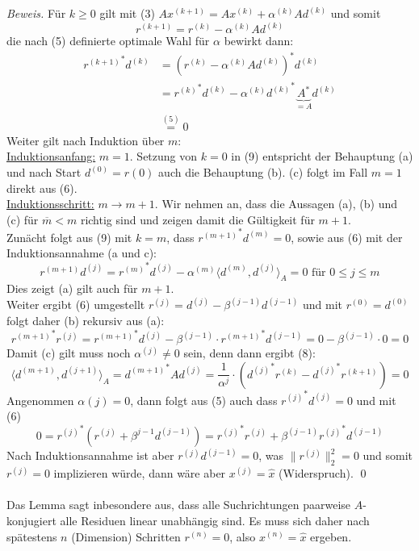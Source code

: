 \documentclass{article}
\begin{document}
\textit{Beweis.} Für $k\geq 0$ gilt mit (3) $Ax^{(k+1)} = Ax^{(k)} + \alpha^{(k)} Ad^{(k)}$ und somit 
\[r^{(k+1)}=r^{(k)}-\alpha^{(k)}Ad^{(k)}\tag{8}\]
die nach (5) definierte optimale Wahl für $\alpha$ bewirkt dann:
\begin{align*}
    {r^{(k+1)}}^*d^{(k)} &= (r^{(k)}-\alpha^{(k)}Ad^{(k)})^* d^{(k)} \\
    &= {r^{(k)}}^* d^{(k)} - \alpha^{(k)}{d^{(k)}}^*\underbrace{A^*}_{=A}d^{(k)} \\
    &\stackrel{(5)}{=} 0 \tag{9}
\end{align*}
Weiter gilt nach Induktion über $m$: \\
\underline{Induktionsanfang:} $m=1$. Setzung von $k=0$ in (9) entspricht der Behauptung (a) 
und nach Start $d^{(0)}=r{(0)}$ auch die Behauptung (b). (c) folgt im Fall $m=1$ direkt aus (6). \\
\underline{Induktionsschritt:} $m\rightarrow m+1$. Wir nehmen an, dass die Aussagen (a), (b) und (c) 
für $\overline{m}<m$ richtig sind und zeigen damit die Gültigkeit für $m+1$. \\
Zunächt folgt aus (9) mit $k=m$, dass ${r^{(m+1)}}^*d^{(m)} = 0$, sowie aus (6) mit der Induktionsannahme (a und c):
\[{r^{(m+1)}}d^{(j)} = {r^{(m)}}^*d^{(j)} - \alpha^{(m)}\langle d^{(m)}, d^{(j)} \rangle_A = 0 
\text{ für } 0\leq j\leq m\]
Dies zeigt (a) gilt auch für $m+1$. \\
Weiter ergibt (6) umgestellt $r^{(j)} = d^{(j)} - \beta^{(j-1)}d^{(j-1)}$ und mit $r^{(0)}=d^{(0)}$ folgt 
daher (b) rekursiv aus (a):
\[{r^{(m+1)}}^*r^{(j)} = {r^{(m+1)}}^*d^{(j)} - \beta^{(j-1)}\cdot {r^{(m+1)}}^*d^{(j-1)} = 
0 - \beta^{(j-1)}\cdot 0 = 0\]
Damit (c) gilt muss noch $\alpha^{(j)}\neq 0$ sein, denn dann ergibt (8):
\[\langle d^{(m+1)}, d^{(j+1)}\rangle_A = {d^{(m+1)}}^*Ad^{(j)} = 
\dfrac{1}{\alpha^{j}}\cdot\left({d^{(j)}}^*r^{(k)}-{d^{(j)}}^*r^{(k+1)}\right) = 0 \]
Angenommen $\alpha{(j)} = 0$, dann folgt aus (5) auch dass ${r^{(j)}}^*d^{(j)}=0$ und mit (6) 
\[0 = {r^{(j)}}^*\left(r^{(j)}+\beta^{j-1}d^{(j-1)}\right) = {r^{(j)}}^*r^{(j)}+\beta^{(j-1)}{r^{(j)}}^*d^{(j-1)}\]
Nach Induktionsannahme ist aber ${r^{(j)}}d^{(j-1)} = 0$, was $\|r^{(j)}\|_2^2 = 0$ und 
somit $r^{(j)} = 0$ implizieren würde, dann wäre aber $x^{(j)}=\hat{x}$ (Widerspruch). \qed \\ \\
Das Lemma sagt inbesondere aus, dass alle Suchrichtungen paarweise $A$-konjugiert alle Residuen linear unabhängig sind.
Es muss sich daher nach spätestens $n$ (Dimension) Schritten $r^{(n)}=0$, also $x^{(n)}=\hat{x}$ ergeben.
\end{document}
